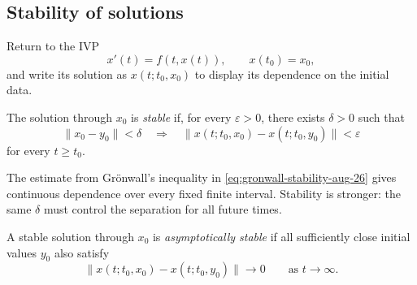 \begin{center}
\end{center}

\subsection{Stability of solutions}

Return to the IVP
\begin{equation}\label{eq:ivp-stability-sep-09}
  x'(t)=f(t,x(t)),
  \qquad x(t_0)=x_0,
\end{equation}
and write its solution as \(x(t;t_0,x_0)\) to display its dependence on
the initial data.

\begin{definition}
  The solution through \(x_0\) is \emph{stable} if, for every
  \(\varepsilon>0\), there exists \(\delta>0\) such that
  \[
    \lVert x_0-y_0\rVert<\delta
    \quad\Longrightarrow\quad
    \bigl\lVert x(t;t_0,x_0)-x(t;t_0,y_0)\bigr\rVert<\varepsilon
  \]
  for every \(t\geq t_0\).
\end{definition}

The estimate from Gr\"onwall's inequality in
\eqref{eq:gronwall-stability-aug-26} gives continuous dependence over
every fixed finite interval. Stability is stronger: the same
\(\delta\) must control the separation for all future times.

\begin{definition}
  A stable solution through \(x_0\) is \emph{asymptotically stable} if
  all sufficiently close initial values \(y_0\) also satisfy
  \[
    \bigl\lVert x(t;t_0,x_0)-x(t;t_0,y_0)\bigr\rVert
    \longrightarrow0
    \qquad\text{as }t\to\infty.
  \]
\end{definition}


